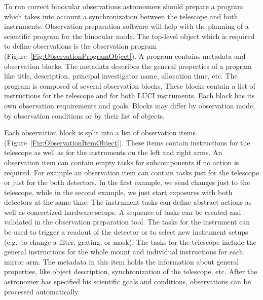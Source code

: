 To run correct binocular observations astronomers should prepare a program which takes into account a synchronization between the telescope and both instruments. Observation preparation software will help with the planning of a scientific program for the binocular mode. The top-level object which is required to define observations is the observation program (Figure~\ref{Fig:ObservationProgramObject}). A program contains metadata and observation blocks. The metadata describes the general properties of a program like title, description, principal investigator name, allocation time, etc. 
The program is composed of several observation blocks. These blocks contain a list of instructions for the telescope and for both LUCI instruments. Each block has its own observation requirements and goals. Blocks may differ by observation mode, by observation conditions or by their list of objects. 

Each observation block is split into a list of observation items (Figure~\ref{Fig:ObservationItemObject}). These items contain instructions for the telescope as well as for the instruments on the left and right arms. An observation item can contain empty tasks for subcomponents if no action is required. For example an observation item can contain tasks just for the telescope or just for the both detectors. In the first example, we send changes just to the telescope, while in the second example, we just start exposures with both detectors at the same time. The instrument tasks can define abstract actions as well as concretized hardware setups. A sequence of tasks can be created and validated in the observation preparation tool.  The tasks for the instrument can be used to trigger a readout of the detector or to select new instrument setups (e.g.\ to change a filter, grating, or mask). The tasks for the telescope include the general instructions for the whole mount and individual instructions for each mirror arm. The metadata in this item holds the information about general properties, like object description, synchronization of the telescope, etc. After the astronomer has specified his scientific goals and conditions, observations can be processed automatically.

